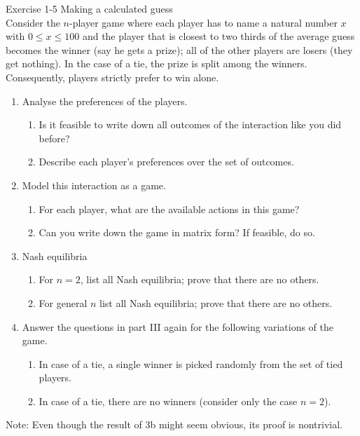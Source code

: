 \documentclass[../main.tex]{subfiles}
\begin{document}
\begin{solution}

\end{solution}

\begin{question}
Exercise 1-5 Making a calculated guess\\
Consider the $n$-player game where each player has to name a natural number $x$ with $ 0 \leq x \leq 100$ and the player that is closest to two thirds of the average guess becomes the winner (say he gets a prize); all of the other players are losers (they get nothing). In the case of a tie, the prize is split among the winners. Consequently, players strictly prefer to win alone.\\

\begin{enumerate}
\item Analyse the preferences of the players.
	\begin{enumerate}
	\item Is it feasible to write down all outcomes of the interaction like you did before?
	\item Describe each player’s preferences over the set of outcomes.
	\end{enumerate}
\item Model this interaction as a game.
	\begin{enumerate}
	\item For each player, what are the available actions in this game?
	\item Can you write down the game in matrix form? If feasible, do so.
	\end{enumerate}
\item Nash equilibria
	\begin{enumerate}
	\item For $n = 2$, list all Nash equilibria; prove that there are no others.
	\item For general $n$ list all Nash equilibria; prove that there are no others.
	\end{enumerate}	
\item Answer the questions in part III again for the following variations of the game.
	\begin{enumerate}
	\item In case of a tie, a single winner is picked randomly from the set of tied players.
	\item In case of a tie, there are no winners (consider only the case $n=2$).
	\end{enumerate}	
\end{enumerate}
Note: Even though the result of 3b might seem obvious, its proof is nontrivial.
\end{question}
\end{document}
